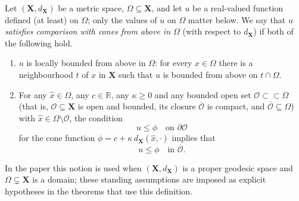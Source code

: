 \begin{definition}
Let $(\mathbf X, d_{\mathbf X})$ be a metric space, $\Omega\subseteq\mathbf X$, and let $u$ be a real-valued function defined (at least) on $\Omega$; only the values of $u$ on $\Omega$ matter below. We say that $u$ \emph{satisfies comparison with cones from above in $\Omega$} (with respect to $d_{\mathbf X}$) if both of the following hold.
\begin{enumerate}
\item $u$ is locally bounded from above in $\Omega$: for every $x\in\Omega$ there is a neighbourhood $t$ of $x$ in $\mathbf X$ such that $u$ is bounded from above on $t\cap\Omega$.
\item For any $\hat x\in\Omega$, any $c\in\mathbb R$, any $\kappa\ge 0$ and any bounded open set $\mathcal O\subset\subset\Omega$ (that is, $\mathcal O\subseteq \mathbf X$ is open and bounded, its closure $\overline{\mathcal O}$ is compact, and $\overline{\mathcal O}\subseteq\Omega$) with $\hat x\in\Omega\setminus\mathcal O$, the condition
\[
u\le \phi\quad\text{on }\partial\mathcal O
\]
for the cone function $\phi=c+\kappa\, d_{\mathbf X}(\hat x,\cdot)$ implies that
\[
u\le\phi\quad\text{in }\overline{\mathcal O}.
\]
\end{enumerate}
In the paper this notion is used when $(\mathbf X,d_{\mathbf X})$ is a proper geodesic space and $\Omega\subsetneq\mathbf X$ is a domain; these standing assumptions are imposed as explicit hypotheses in the theorems that use this definition.
\end{definition}
